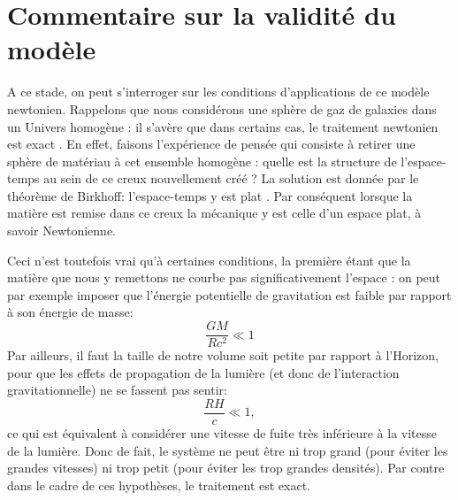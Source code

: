 \section{Commentaire sur la validité du modèle}
A ce stade, on peut s'interroger sur les conditions d'applications de ce modèle newtonien. Rappelons que nous considérons une sphère de gaz de galaxies dans un Univers homogène : il s'avère que dans certains cas, le traitement newtonien est exact . En effet, faisons l'expérience de pensée qui consiste à retirer une sphère de matériau à cet ensemble homogène : quelle est la structure de l'espace-temps au sein de ce creux nouvellement créé ? La solution est donnée par le théorème de Birkhoff: l'espace-temps y est plat . Par conséquent lorsque la matière est remise dans ce creux la mécanique y est celle d'un espace plat, à savoir Newtonienne.

Ceci n'est toutefois vrai qu'à certaines conditions, la première étant que la matière que nous y remettons ne courbe pas significativement l'espace : on peut par exemple imposer que l'énergie potentielle de gravitation est faible par rapport à son énergie de masse:
\begin{equation}
\frac{GM}{Rc^2}\ll 1
\end{equation}
Par ailleurs, il faut la taille de notre volume soit petite par rapport à l'Horizon, pour que les effets de propagation de la lumière (et donc de l'interaction gravitationnelle) ne se fassent pas sentir:
\begin{equation}
\frac{RH}{c}\ll 1,
\end{equation}
ce qui est équivalent à considérer une vitesse de fuite très inférieure à la vitesse de la lumière. Donc de fait, le système ne peut être ni trop grand (pour éviter les grandes vitesses) ni trop petit (pour éviter les trop grandes densités). Par contre dans le cadre de ces hypothèses, le traitement est exact.

